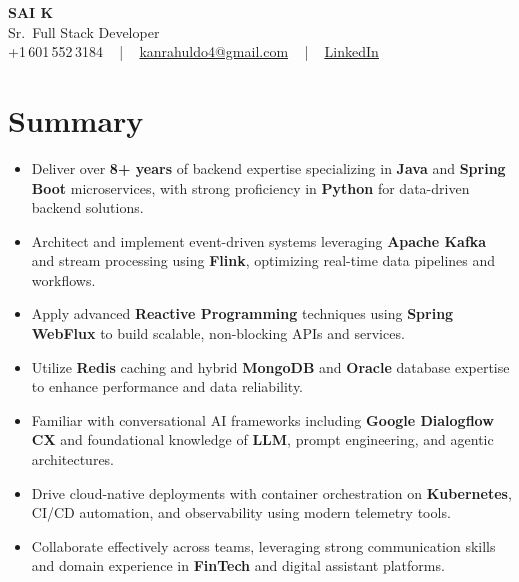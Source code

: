 \documentclass[letterpaper,11pt]{article}
\newcommand{\resumeItem}[1]{
  \item\footnotesize{
    {#1 \vspace{-2pt}}
  }
}
\newcommand{\resumeItemListStart}{\begin{itemize}[leftmargin=*]}
\newcommand{\resumeItemListEnd}{\end{itemize}\vspace{-5pt}}
\begin{document}
\begin{center}
    {\fontsize{14pt}{12pt}\selectfont \textbf{\MakeUppercase{Sai K}}}\\ \vspace{2pt}
    \fontsize{10pt}{12pt}\selectfont Sr.\ Full Stack Developer\\ \vspace{2pt}
    \fontsize{10pt}{12pt}\selectfont +1\,601\,552\,3184 ~ | ~
    \href{mailto:kanrahuldo4@gmail.com}{kanrahuldo4@gmail.com} ~ | ~
    \href{https://www.linkedin.com/in/srrrk/}{\color{blue}\underline{LinkedIn}}
    \vspace{-10pt}
\end{center}

\section{Summary}
\fontsize{9pt}{10pt}\selectfont
\resumeItemListStart
  \resumeItem{Deliver over \textbf{8+ years} of backend expertise specializing in \textbf{Java} and \textbf{Spring Boot} microservices, with strong proficiency in \textbf{Python} for data-driven backend solutions.}
  \resumeItem{Architect and implement event-driven systems leveraging \textbf{Apache Kafka} and stream processing using \textbf{Flink}, optimizing real-time data pipelines and workflows.}
  \resumeItem{Apply advanced \textbf{Reactive Programming} techniques using \textbf{Spring WebFlux} to build scalable, non-blocking APIs and services.}
  \resumeItem{Utilize \textbf{Redis} caching and hybrid \textbf{MongoDB} and \textbf{Oracle} database expertise to enhance performance and data reliability.}
  \resumeItem{Familiar with conversational AI frameworks including \textbf{Google Dialogflow CX} and foundational knowledge of \textbf{LLM}, prompt engineering, and agentic architectures.}
  \resumeItem{Drive cloud-native deployments with container orchestration on \textbf{Kubernetes}, CI/CD automation, and observability using modern telemetry tools.}
  \resumeItem{Collaborate effectively across teams, leveraging strong communication skills and domain experience in \textbf{FinTech} and digital assistant platforms.}
\resumeItemListEnd
\vspace{-6pt}

\end{document}
